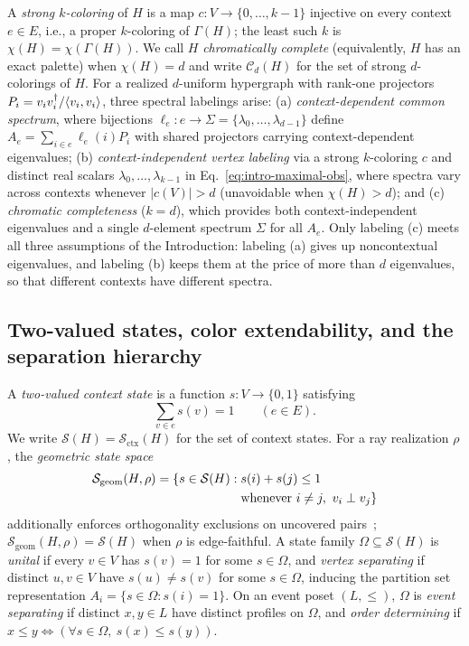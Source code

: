 \documentclass[aps,pra,reprint,superscriptaddress,longbibliography,nofootinbib,floatfix,10pt]{revtex4-2}
\theoremstyle{definition}\newtheorem{definition}[theorem]{Definition}
\theoremstyle{remark}\newtheorem{remark}[theorem]{Remark}
\newcommand{\Sc}{\mathcal S}\newcommand{\Cc}{\mathcal C}
\begin{document}
A \emph{strong $k$-coloring} of $H$ is a map $c:V\to\{0,\ldots,k-1\}$ injective on every context $e\in E$, i.e., a proper $k$-coloring of $\Gamma(H)$; the least such $k$ is $\chi(H)=\chi(\Gamma(H))$. We call $H$ \emph{chromatically complete} (equivalently, $H$ has an exact palette) when $\chi(H)=d$ and write $\Cc_d(H)$ for the set of strong $d$-colorings of $H$. For a realized $d$-uniform hypergraph with rank-one projectors $P_i=v_iv_i^\dagger/\langle v_i,v_i\rangle$, three spectral labelings arise: (a) \emph{context-dependent common spectrum}, where bijections $\ell_e:e\to\Sigma=\{\lambda_0,\ldots,\lambda_{d-1}\}$ define $A_e=\sum_{i\in e}\ell_e(i)P_i$ with shared projectors carrying context-dependent eigenvalues; (b) \emph{context-independent vertex labeling} via a strong $k$-coloring $c$ and distinct real scalars $\lambda_0,\ldots,\lambda_{k-1}$ in Eq.~\eqref{eq:intro-maximal-obs}, where spectra vary across contexts whenever $|c(V)|>d$ (unavoidable when $\chi(H)>d$); and (c) \emph{chromatic completeness} ($k=d$), which provides both context-independent eigenvalues and a single $d$-element spectrum $\Sigma$ for all $A_e$. Only labeling (c) meets all three assumptions of the Introduction: labeling (a) gives up noncontextual eigenvalues, and labeling (b) keeps them at the price of more than $d$ eigenvalues, so that different contexts have different spectra.

\subsection{Two-valued states, color extendability, and the separation hierarchy}

A \emph{two-valued context state} is a function $s:V\to\{0,1\}$ satisfying
\begin{equation}\label{eq:states}
\sum_{v\in e}s(v)=1\qquad(e\in E).
\end{equation}
We write $\Sc(H)=\Sc_{\mathrm{ctx}}(H)$ for the set of context states. For a ray realization $\rho$, the \emph{geometric state space}
\begin{equation}\label{eq:geometric-state-space}
\begin{aligned}
\Sc_{\rm geom}(H,\rho)=\{s\in\Sc(H):{}&s(i)+s(j)\le1\\
&\text{whenever }i\ne j,\ v_i\perp v_j\}
\end{aligned}
\end{equation}
additionally enforces orthogonality exclusions on uncovered pairs~\cite{waegell2011peres}; $\Sc_{\mathrm{geom}}(H,\rho)=\Sc(H)$ when $\rho$ is edge-faithful. A state family $\Omega\subseteq\Sc(H)$ is \emph{unital} if every $v\in V$ has $s(v)=1$ for some $s\in\Omega$, and \emph{vertex separating} if distinct $u,v\in V$ have $s(u)\ne s(v)$ for some $s\in\Omega$, inducing the partition set representation $A_i=\{s\in\Omega:s(i)=1\}$. On an event poset $(L,\le)$, $\Omega$ is \emph{event separating} if distinct $x,y\in L$ have distinct profiles on $\Omega$, and \emph{order determining} if $x\le y \iff (\forall s\in\Omega,\ s(x)\le s(y))$.
\end{document}
